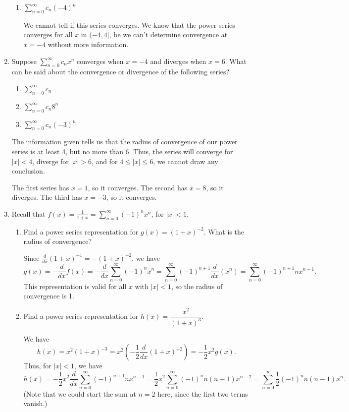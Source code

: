 \documentclass[12pt]{article}
\newcommand{\di}{\displaystyle}
\newcommand{\abs}[1]{\left\lvert #1\right\rvert}
\begin{document}
\begin{enumerate}
\begin{enumerate}
\item $\di\sum_{n=0}^\infty c_n(-4)^n$

We cannot tell if this series converges. We know that the power series converges for all $x$ in $(-4,4]$, be we can't determine convergence at $x=-4$ without more information.
\end{enumerate}



\item Suppose $\sum_{n=0}^\infty c_nx^n$ converges when $x=-4$ and diverges when $x=6$. What can be said about the convergence or divergence of the following series?
\begin{multicols}{3}
\begin{enumerate}
\item $\sum_{n=0}^\infty c_n$
\item $\sum_{n=0}^\infty c_n8^n$
\item $\sum_{n=0}^\infty c_n(-3)^n$
\end{enumerate}
\end{multicols}

The information given tells us that the radius of convergence of our power series is at least 4, but no more than 6. Thus, the series will converge for $\abs{x}<4$, diverge for $\abs{x}>6$, and for $4\leq \abs{x}\leq 6$, we cannot draw any conclusion.

The first series has $x=1$, so it converges. The second has $x=8$, so it diverges. The third has $x=-3$, so it converges. 

\item Recall that $f(x) =\frac{1}{1+x} = \sum_{n=0}^\infty (-1)^nx^n$, for $\abs{x}<1$.
\begin{enumerate}
\item Find a power series representation for $g(x)=(1+x)^{-2}$. What is the radius of convergence?

Since $\frac{d}{dx}(1+x)^{-1} = -(1+x)^{-2}$, we have
\[
g(x) = -\frac{d}{dx}f(x) = -\frac{d}{dx}\sum_{n=0}^\infty(-1)^nx^n = \sum_{n=0}^\infty (-1)^{n+1}\frac{d}{dx}(x^n) = \sum_{n=0}^\infty (-1)^{n+1}nx^{n-1}.
\]
This representation is valid for all $x$ with $\abs{x}<1$, so the radius of convergence is 1.

\item Find a power series representation for $h(x) = \dfrac{x^2}{(1+x)^3}$.

We have 
\[
h(x) = x^2(1+x)^{-3} = x^2\left(-\frac{1}{2}\frac{d}{dx}(1+x)^{-2}\right) = -\frac{1}{2}x^2g(x).
\]
Thus, for $\abs{x}<1$, we have
\[
h(x) = -\frac12 x^2\frac{d}{dx}\sum_{n=0}^\infty (-1)^{n+1}nx^{n-1}=\frac12 x^2\sum_{n=0}^\infty (-1)^nn(n-1)x^{n-2} = \sum_{n=0}^\infty \frac12 (-1)^n n(n-1)x^n.
\]
(Note that we could start the sum at $n=2$ here, since the first two terms vanish.)
\end{enumerate}


\end{enumerate}
\end{document}
